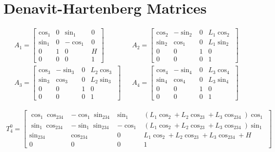 \documentclass[paper=letter, fontsize=10pt]{scrartcl}	%
\numberwithin{equation}{section}															%
\numberwithin{figure}{section}																%
\numberwithin{table}{section}																%
\begin{document}


\newpage
\appendix
\section{\\Denavit-Hartenberg Matrices} \label{App:AppendixA}
\begin{align} 
	A_1 = 
	\begin{bmatrix}
	\cos_1 	& 0  & \sin_1 	& 0 \\
  	\sin_1 	& 0  & -\cos_1 	& 0 \\
  	0		& 1  & 0 		& H \\
  	0		& 0  & 0 		& 1 
	\end{bmatrix} &&
	A_2 = 
	\begin{bmatrix}
	\cos_2 	& -\sin_2  & 0 	& L_1\cos_2 \\
  	\sin_2 	& \cos_1  & 0 	& L_1\sin_2 \\
  	0		& 0  & 1 		& 0 \\
  	0		& 0  & 0 		& 1 
	\end{bmatrix}\\
	A_3 = 
	\begin{bmatrix}
	\cos_3 	& -\sin_3  & 0 	& L_2\cos_3 \\
  	\sin_3 	& \cos_3  & 0 	& L_2\sin_3 \\
  	0		& 0  & 1 		& 0 \\
  	0		& 0  & 0 		& 1 
	\end{bmatrix} && 
	A_4 = 
	\begin{bmatrix}
	\cos_4 	& -\sin_4  & 0 	& L_3\cos_4 \\
  	\sin_4 	& \cos_4  & 0 	& L_3\sin_4 \\
  	0		& 0  & 1 		& 0 \\
  	0		& 0  & 0 		& 1 
	\end{bmatrix}
\end{align}

\begin{align}
T_4^0 = 
	\begin{bmatrix}
	\cos_1 \cos_{234} 	& -\cos_1 \sin_{234} 	& \sin_1 	& (L_1\cos_2+L_2\cos_{23}+L_3\cos_{234})\cos_1 \\
  	\sin_1 \cos_{234} 	& -\sin_1 \sin_{234}  	& -\cos_1 	& (L_1\cos_2+L_2\cos_{23}+L_3\cos_{234})\sin_1 \\
  	\sin_{234}			& \cos_{234}  			& 0 		& L_1\cos_2+L_2\cos_{23}+L_3\cos_{234} + H \\
  	0					& 0  					& 0 		& 1 
	\end{bmatrix}
\end{align}
\end{document}
